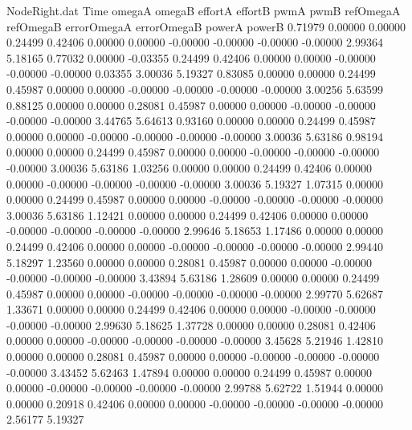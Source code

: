 \begin{filecontents}{NodeRight.dat}
Time omegaA omegaB effortA effortB pwmA pwmB refOmegaA refOmegaB errorOmegaA errorOmegaB powerA powerB
   0.71979    0.00000    0.00000     0.24499    0.42406    0.00000    0.00000   -0.00000   -0.00000   -0.00000   -0.00000    2.99364    5.18165
   0.77032    0.00000   -0.03355     0.24499    0.42406    0.00000    0.00000   -0.00000   -0.00000   -0.00000    0.03355    3.00036    5.19327
   0.83085    0.00000    0.00000     0.24499    0.45987    0.00000    0.00000   -0.00000   -0.00000   -0.00000   -0.00000    3.00256    5.63599
   0.88125    0.00000    0.00000     0.28081    0.45987    0.00000    0.00000   -0.00000   -0.00000   -0.00000   -0.00000    3.44765    5.64613
   0.93160    0.00000    0.00000     0.24499    0.45987    0.00000    0.00000   -0.00000   -0.00000   -0.00000   -0.00000    3.00036    5.63186
   0.98194    0.00000    0.00000     0.24499    0.45987    0.00000    0.00000   -0.00000   -0.00000   -0.00000   -0.00000    3.00036    5.63186
   1.03256    0.00000    0.00000     0.24499    0.42406    0.00000    0.00000   -0.00000   -0.00000   -0.00000   -0.00000    3.00036    5.19327
   1.07315    0.00000    0.00000     0.24499    0.45987    0.00000    0.00000   -0.00000   -0.00000   -0.00000   -0.00000    3.00036    5.63186
   1.12421    0.00000    0.00000     0.24499    0.42406    0.00000    0.00000   -0.00000   -0.00000   -0.00000   -0.00000    2.99646    5.18653
   1.17486    0.00000    0.00000     0.24499    0.42406    0.00000    0.00000   -0.00000   -0.00000   -0.00000   -0.00000    2.99440    5.18297
   1.23560    0.00000    0.00000     0.28081    0.45987    0.00000    0.00000   -0.00000   -0.00000   -0.00000   -0.00000    3.43894    5.63186
   1.28609    0.00000    0.00000     0.24499    0.45987    0.00000    0.00000   -0.00000   -0.00000   -0.00000   -0.00000    2.99770    5.62687
   1.33671    0.00000    0.00000     0.24499    0.42406    0.00000    0.00000   -0.00000   -0.00000   -0.00000   -0.00000    2.99630    5.18625
   1.37728    0.00000    0.00000     0.28081    0.42406    0.00000    0.00000   -0.00000   -0.00000   -0.00000   -0.00000    3.45628    5.21946
   1.42810    0.00000    0.00000     0.28081    0.45987    0.00000    0.00000   -0.00000   -0.00000   -0.00000   -0.00000    3.43452    5.62463
   1.47894    0.00000    0.00000     0.24499    0.45987    0.00000    0.00000   -0.00000   -0.00000   -0.00000   -0.00000    2.99788    5.62722
   1.51944    0.00000    0.00000     0.20918    0.42406    0.00000    0.00000   -0.00000   -0.00000   -0.00000   -0.00000    2.56177    5.19327

\end{filecontents}
